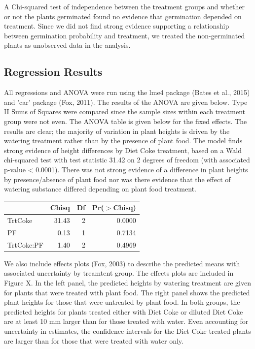 \documentclass[1p,12pt]{elsarticle}\usepackage[]{graphicx}\usepackage[]{color}
\begin{document}
A Chi-squared test of independence between the treatment groups and whether or not the plants germinated found no evidence that germination depended on treatment.  Since we did not find strong evidence supporting a relationship between germination probability and treatment, we treated the non-germinated plants as unobserved data in the analysis. 



\subsection{Regression Results}

All regressions and ANOVA were run using the lme4 package (Bates et al., 2015) and 'car' package (Fox, 2011). The results of the ANOVA are given below. Type II Sums of Squares were compared since the sample sizes within each treatment group were not even. The ANOVA table is given below for the fixed effects. The results are clear; the majority of variation in plant heights is driven by the watering treatment rather than by the presence of plant food.  The model finds strong evidence of height differences by Diet Coke treatment, based on a Wald chi-squared test with test statistic 31.42 on 2 degrees of freedom (with associated p-value < 0.0001). There was not strong evidence of a difference in plant heights by presence/absence of plant food nor was there evidence that the effect of watering substance differed depending on plant food treatment. 

\begin{table}[ht]
\centering
\begin{tabular}{lrrr}
  \hline
 & Chisq & Df & Pr($>$Chisq) \\ 
  \hline
TrtCoke & 31.43 & 2 & 0.0000 \\ 
  PF & 0.13 & 1 & 0.7134 \\ 
  TrtCoke:PF & 1.40 & 2 & 0.4969 \\ 
   \hline
\end{tabular}
\end{table}
 

We also include effects plots (Fox, 2003) to describe the predicted means with associated uncertainty by treamtent group. The effects plots are included in Figure X. In the left panel, the predicted heights by watering treatment are given for plants that were treated with plant food. The right panel shows the predicted plant heights for those that were untreated by plant food. In both groups, the predicted heights for plants treated either with Diet Coke or diluted Diet Coke are at least 10 mm larger than for those treated with water. Even accounting for uncertainty in estimates, the confidence intervals for the Diet Coke treated plants are larger than for those that were treated with water only.  
\end{document}
